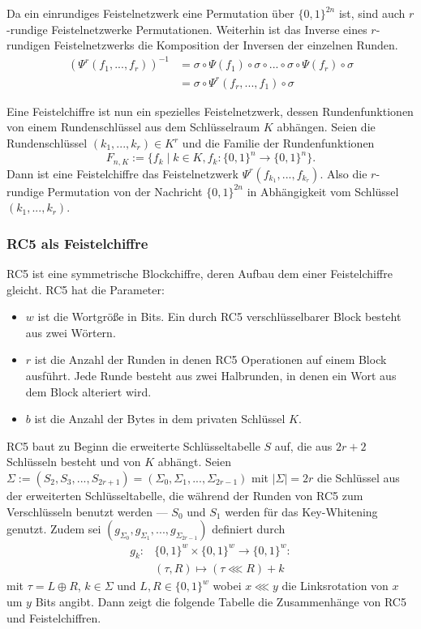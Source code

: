 \documentclass[course=erap]{aspdoc}
\begin{document}
Da ein einrundiges Feistelnetzwerk eine Permutation über $\{0,1\}^{2n}$ ist, sind auch $r$-rundige Feistelnetzwerke Permutationen. Weiterhin ist das Inverse eines $r$-rundigen Feistelnetzwerks die Komposition der Inversen der einzelnen Runden.
\begin{align*}
    (\Psi^r(f_1, ..., f_r))^{-1} &= \sigma \circ \Psi(f_1) \circ \sigma \circ ... \circ \sigma \circ \Psi(f_r) \circ \sigma \\
                                 &= \sigma \circ \Psi^r(f_r, ..., f_1) \circ \sigma
\end{align*}\cite[p.13]{nachef}\bigbreak

Eine Feistelchiffre ist nun ein spezielles Feistelnetzwerk, dessen Rundenfunktionen von einem Rundenschlüssel aus dem Schlüsselraum $K$ abhängen.
Seien die Rundenschlüssel $(k_1, ..., k_r) \in K^r$ und die Familie der Rundenfunktionen
\[
    F_{n, K} := \{f_k \mid k \in K, f_k \colon \{0, 1\}^n \to \{0, 1\}^n\}.
\]
Dann ist eine Feistelchiffre das Feistelnetzwerk $\Psi^r(f_{k_1},...,f_{k_r})$. Also die $r$-rundige Permutation von der Nachricht $\{0, 1\}^{2n}$ in Abhängigkeit vom Schlüssel $(k_1, ..., k_r)$.\cite[p.14]{nachef}

\subsubsection{RC5 als Feistelchiffre}

RC5 ist eine symmetrische Blockchiffre, deren Aufbau dem einer Feistelchiffre gleicht. RC5 hat die Parameter:\cite[p.2f]{rc5rev}

\begin{itemize}
    \item $w$ ist die Wortgröße in Bits. Ein durch RC5 verschlüsselbarer Block besteht aus zwei Wörtern.
    \item $r$ ist die Anzahl der Runden in denen RC5 Operationen auf einem Block ausführt. Jede Runde besteht aus zwei Halbrunden, in denen ein Wort aus dem Block alteriert wird.
    \item $b$ ist die Anzahl der Bytes in dem privaten Schlüssel $K$.
\end{itemize}

RC5 baut zu Beginn die erweiterte Schlüsseltabelle $S$ auf, die aus $2r + 2$ Schlüsseln besteht und von $K$ abhängt. Seien $\Sigma := (S_2, S_3, ..., S_{2r+1}) = (\Sigma_0, \Sigma_1, ..., \Sigma_{2r-1})$ mit $|\Sigma| = 2r$ die Schlüssel aus der erweiterten Schlüsseltabelle, die während der Runden von RC5 zum Verschlüsseln benutzt werden --- $S_0$ und $S_1$ werden für das Key-Whitening genutzt. Zudem sei $(g_{\Sigma_0}, g_{\Sigma_1}, ..., g_{\Sigma_{2r-1}})$ definiert durch
\begin{align*}
    g_k \colon &\{0, 1\}^w \times \{0, 1\}^w \to \{0, 1\}^w \colon \\
               &(\tau, R) \mapsto (\tau \lll R) + k
\end{align*}
mit $\tau = L \oplus R$, $k \in \Sigma$ und $L, R \in \{0, 1\}^w$ wobei $x \lll y$ die Linksrotation von $x$ um $y$ Bits angibt. Dann zeigt die folgende Tabelle die Zusammenhänge von RC5 und Feistelchiffren.
\end{document}
